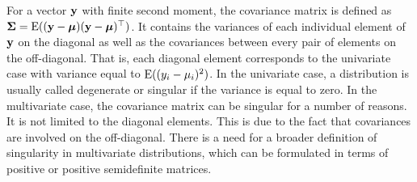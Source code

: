 \documentclass[12pt, oneside]{book}\usepackage{knitr}
\begin{document}
For a vector $\mathbf{y}$ with finite second moment, the covariance matrix is defined as $\mathbf{\Sigma}=\operatorname{E}((\mathbf{y} - \mbox{\boldmath$\mu$})(\mathbf{y} - \mbox{\boldmath$\mu$})^\top)$. 
It contains the variances of each individual element of $\mathbf{y}$ on the diagonal as well as the covariances between every pair of elements on the off-diagonal. 
That is, each diagonal element corresponds to the univariate case with variance equal to $\operatorname{E}((y_i - \mu_i)^2)$. 
In the univariate case, a distribution is usually called degenerate or singular if the variance is equal to zero. 
In the multivariate case, the covariance matrix can be singular for a number of reasons. 
It is not limited to the diagonal elements.
This is due to the fact that covariances are involved on the off-diagonal.
There is a need for a broader definition of singularity in multivariate distributions, which can be formulated in terms of positive or positive semidefinite matrices. 
\end{document}
